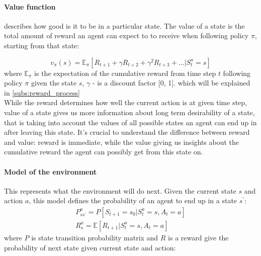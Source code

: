 
\paragraph{Value function} describes how good is it to be in a particular state.
The value of a state is the total amount of reward an agent can expect to
to receive when following policy $\pi$, starting from that state:

\begin{equation} \label{eq:general_value_function}
	v_{\pi}(s) = \mathbb{E}_{\pi} [R_{t+1} + \gamma R_{t+2} + \gamma^2 R_{t+3} + ... | S_t^a = s]
\end{equation}
where $\mathbb{E}_{\pi}$ is the expectation of the cumulative reward from time step $t$
following policy $\pi$ given the state $s$, $\gamma$ - is a discount factor [0, 1].
 which will be explained in \autoref{subs:reward_process}\\
While the reward determines how well the current action is at given time step, value of a state
gives us more information about long term desirability of a state, that is
taking into account
the values of all possible states an agent can end up in after leaving this state.
It's crucial to understand the difference between reward and value: reward is immediate,
while the value giving us insights about the cumulative reward the agent can possibly get
from this state on.

\paragraph{Model of the environment} This represents what the environment will do next. Given
the current state $s$ and action $a$, this model defines the probability of an agent to end up in
a state $s^\prime$:
\begin{align} \label{eq:model_env}
P^a_{ss^{\prime}} = P[S_{t+1} = s_0 | S_t^a = s, A_t = a] \\
R^a_s = \mathbb{E}[R_{t+1} | S_t^a = s, A_t = a]
\end{align}
where $P$ is state transition probability matrix and $R$ is a reward give
	the probability of next state given current state and action:

